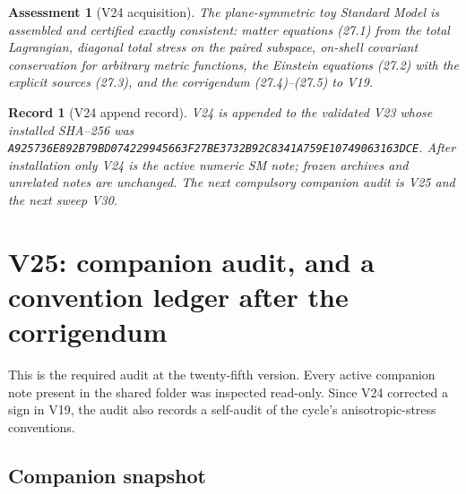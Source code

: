 \documentclass[11pt]{article}
\newtheorem{assessment}[theorem]{Assessment}
\newtheorem{record}[theorem]{Record}
\theoremstyle{remark}
\begin{document}
\begin{assessment}[V24 acquisition]
\label{ass:v20v24}
The plane-symmetric toy Standard Model is assembled and certified
exactly consistent: matter equations (27.1) from the total
Lagrangian, diagonal total stress on the paired subspace, on-shell
covariant conservation for arbitrary metric functions, the Einstein
equations (27.2) with the explicit sources (27.3), and the
corrigendum (27.4)--(27.5) to V19.
\end{assessment}

\begin{record}[V24 append record]
\label{rec:v20v24}
V24 is appended to the validated V23 whose installed SHA--256 was
\texttt{A925736E892B79BD074229945663F27BE3732B92C8341A759E10749063163DCE}.
After installation only V24 is the active numeric SM note; frozen
archives and unrelated notes are unchanged.  The next compulsory
companion audit is V25 and the next sweep V30.
\end{record}


\section{V25: companion audit, and a convention ledger after the corrigendum}
\label{sec:v20v25}

This is the required audit at the twenty-fifth version.  Every
active companion note present in the shared folder was inspected
read-only.  Since V24 corrected a sign in V19, the audit also records
a self-audit of the cycle's anisotropic-stress conventions.

\subsection{Companion snapshot}
\end{document}
